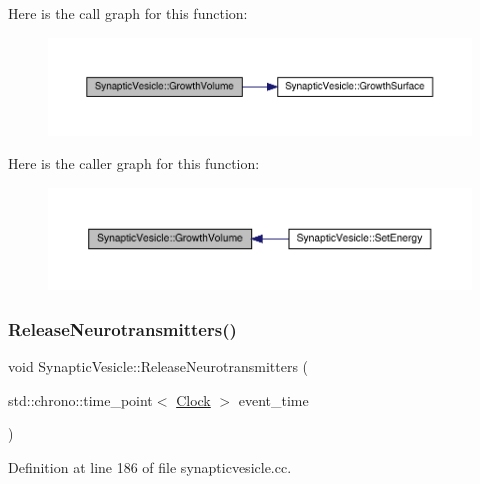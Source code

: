 Here is the call graph for this function\+:
\nopagebreak
\begin{figure}[H]
\begin{center}
\leavevmode
\includegraphics[width=350pt]{class_synaptic_vesicle_a0d4a4a03405593b3abc0e734c1758830_cgraph}
\end{center}
\end{figure}
Here is the caller graph for this function\+:
\nopagebreak
\begin{figure}[H]
\begin{center}
\leavevmode
\includegraphics[width=350pt]{class_synaptic_vesicle_a0d4a4a03405593b3abc0e734c1758830_icgraph}
\end{center}
\end{figure}
\mbox{\label{class_synaptic_vesicle_a2509969e82fee789cc56fb0978f27662}} 
\subsubsection{\texorpdfstring{Release\+Neurotransmitters()}{ReleaseNeurotransmitters()}}
{\footnotesize\ttfamily void Synaptic\+Vesicle\+::\+Release\+Neurotransmitters (\begin{DoxyParamCaption}\item[{std\+::chrono\+::time\+\_\+point$<$ \hyperlink{universe_8h_a0ef8d951d1ca5ab3cfaf7ab4c7a6fd80}{Clock} $>$}]{event\+\_\+time }\end{DoxyParamCaption})}



Definition at line 186 of file synapticvesicle.\+cc.

